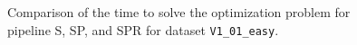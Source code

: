 \begin{figure}[tb]
  \centering     %
  \caption{Comparison of the time to solve the optimization problem for pipeline S, SP, and SPR for dataset \texttt{V1\_01\_easy}.}
  \label{fig:optimization_time}
\end{figure}



